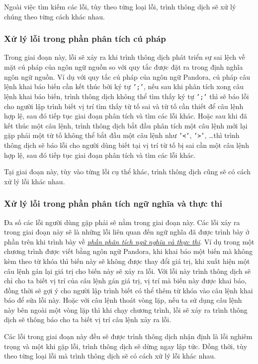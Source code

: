 Ngoài việc tìm kiếm các lỗi, tùy theo từng loại lỗi, trình thông dịch sẽ xử lý chúng theo từng cách khác nhau.

\subsubsection{Xử lý lỗi trong phần phân tích cú pháp}
Trong giai đoạn này, lỗi sẽ xảy ra khi trình thông dịch phát triển sự sai lệch về mặt cú pháp của ngôn ngữ nguồn so với quy tắc được đặt ra trong định nghĩa ngôn ngữ nguồn. Ví dụ với quy tắc cú pháp của ngôn ngữ Pandora, cú pháp câu lệnh khai báo biến cần kết thúc bởi ký tự \texttt{';'}, nếu sau khi phân tích xong câu lệnh khai báo biến, trình thông dịch không thể tìm thấy ký tự \texttt{';'} thì sẽ báo lỗi cho người lập trình biết vị trí tìm thấy từ tố sai và từ tố cần thiết để câu lệnh hợp lệ, sau đó tiếp tục giai đoạn phân tích và tìm các lỗi khác. Hoặc sau khi đã kết thúc một câu lệnh, trình thông dịch bắt đầu phân tích một câu lệnh mới lại gặp phải một từ tố không thể bắt đầu một câu lệnh như \texttt{'<'}, \texttt{'>'}, \dots thì trình thông dịch sẽ báo lỗi cho người dùng biết tại vị trí từ tố bị sai cần một câu lệnh hợp lệ, sau đó tiếp tục giai đoạn phân tích và tìm các lỗi khác.

Tại giai đoạn này, tùy vào từng lỗi cụ thể khác, trình thông dịch cũng sẽ có cách xử lý lỗi khác nhau.

\subsubsection{Xử lý lỗi trong phần phân tích ngữ nghĩa và thực thi}
Đa số các lỗi người dùng gặp phải sẽ nằm trong giai đoạn này. Các lỗi xảy ra trong giai đoạn này sẽ là những lỗi liên quan đến ngữ nghĩa đã được trình bày ở phần trên khi trình bày về \hyperref[ch1:semantic]{\textit{phần phân tích ngữ nghĩa và thực thi}}. Ví dụ trong một chương trình được viết bằng ngôn ngữ Pandora, khi khai báo một biến mà không kèm theo từ khóa  thì biến này sẽ không được thay đổi giá trị, khi xuất hiện một câu lệnh gán lại giá trị cho biến này sẽ xảy ra lỗi. Với lỗi này trình thông dịch sẽ chỉ cho ta biết vị trí của câu lệnh gán giá trị, vị trí mà biến này được khai báo, đồng thời sẽ gợi ý cho người lập trình biết có thể thêm từ khóa  vào câu lệnh khai báo để sửa lỗi này. Hoặc với câu lệnh thoát vòng lặp, nếu ta sử dụng câu lệnh này bên ngoài một vòng lặp thì khi chạy chương trình, lỗi sẽ xảy ra trình thông dịch sẽ thông báo cho ta biết vị trí câu lệnh xảy ra lỗi.

Các lỗi trong giai đoạn này đều sẽ được trình thông dịch nhận định là lỗi nghiêm trọng và một khi gặp lỗi, trình thông dịch sẽ dừng ngay lập tức. Đồng thời, tùy theo từng loại lỗi mà trình thông dịch sẽ có cách xử lý lỗi khác nhau.
